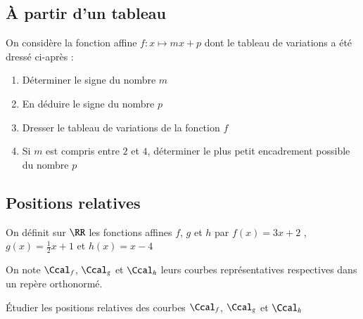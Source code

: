 \documentclass[oneside,12pt]{article}          %
\begin{document}
\subsection{À partir d'un tableau}
On considère la fonction affine $f:x\mapsto mx+p$ dont le tableau de variations a été dressé ci-après :

\begin{center}
\end{center}
\begin{enumerate}
	\item Déterminer le signe du nombre $m$ 
	\item En déduire le signe du nombre $p$
	\item Dresser le tableau de variations de la fonction $f$
	\item Si $m$ est compris entre $2$ et $4$, déterminer le plus petit encadrement possible du nombre $p$
\end{enumerate}



\subsection{Positions relatives}
On définit sur $\RR$ les fonctions affines $f$, $g$ et $h$ par $f(x)=3x+2$ , $g(x)=\frac{1}{2}x+1$ et $h(x)=x-4$

On note $\Ccal_f$, $\Ccal_g$ et $\Ccal_h$ leurs courbes représentatives respectives dans un repère orthonormé.

Étudier les positions relatives des courbes $\Ccal_f$, $\Ccal_g$ et $\Ccal_h$
\end{document}
